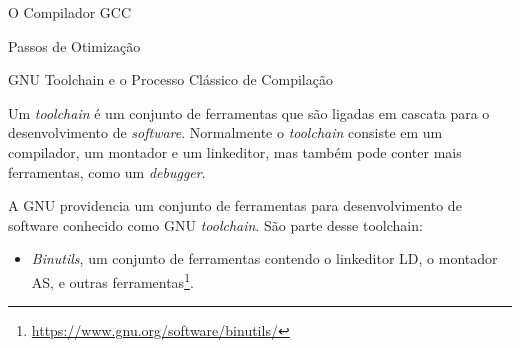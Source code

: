 \begin{section}{O Compilador GCC}
\begin{subsection}{Passos de Otimização}
\end{subsection}

%
%


\begin{subsection}{GNU Toolchain e o Processo Clássico de Compilação}

    Um \textit{toolchain} é um conjunto de ferramentas que são ligadas em
cascata para o desenvolvimento de \textit{software}. Normalmente o
\textit{toolchain} consiste em um compilador, um montador e um linkeditor,
mas também pode conter mais ferramentas, como um \textit{debugger}.

A GNU providencia um conjunto de ferramentas para desenvolvimento de software
conhecido como GNU \textit{toolchain}. São parte desse toolchain:
\begin{itemize}
    \item \textit{Binutils}, um conjunto de ferramentas contendo o linkeditor
LD, o montador AS, e outras ferramentas\footnote{\url{https://www.gnu.org/software/binutils/}}.


\end{itemize}
\end{subsection}
\end{section}
